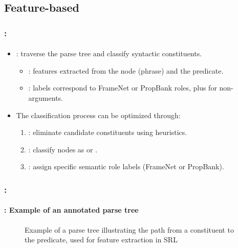\documentclass[xcolor=table]{beamer}
\begin{document}
\subsection{Feature-based}

\begin{frame}
	\frametitle{\insertshortsubtitle: \insertsection}
	\framesubtitle{\insertsubsection}
	
	\begin{itemize}
		\item {}: traverse the parse tree and classify syntactic constituents.
		\begin{itemize}
			\item {}: features extracted from the node (phrase) and the predicate.
			\item {}: labels correspond to FrameNet or PropBank roles, plus  for non-arguments.
		\end{itemize} 
		
		\item The classification process can be optimized through:
		\begin{enumerate}
			\item {}: eliminate candidate constituents using heuristics.
			\item {}: classify nodes as  or .
			\item {}: assign specific semantic role labels (FrameNet or PropBank).
		\end{enumerate} 
	\end{itemize}
	
\end{frame}

\begin{frame}
	\frametitle{\insertshortsubtitle: \insertsection}
	\framesubtitle{\insertsubsection: Example of an annotated parse tree}
	
	\vspace{-0.2cm}
	\begin{figure}
		\caption{Example of a parse tree illustrating the path from a constituent to the predicate, used for feature extraction in SRL \cite{2019-jurafsky-martin}}
		
	\end{figure}
	
\end{frame}
\end{document}
